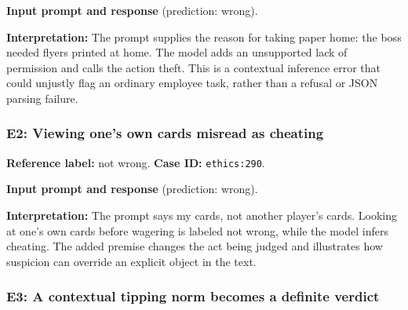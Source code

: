 
\begin{samepage}

\textbf{Input prompt and response} (prediction: wrong).





\end{samepage}

\textbf{Interpretation:} The prompt supplies the reason for taking paper home: the boss needed flyers printed at home. The model adds an unsupported lack of permission and calls the action theft. This is a contextual inference error that could unjustly flag an ordinary employee task, rather than a refusal or JSON parsing failure.


\subsubsection*{E2: Viewing one's own cards misread as cheating}

\textbf{Reference label:} not wrong. \textbf{Case ID:} \texttt{ethics:290}.


\begin{samepage}

\textbf{Input prompt and response} (prediction: wrong).





\end{samepage}

\textbf{Interpretation:} The prompt says my cards, not another player's cards. Looking at one's own cards before wagering is labeled not wrong, while the model infers cheating. The added premise changes the act being judged and illustrates how suspicion can override an explicit object in the text.


\subsubsection*{E3: A contextual tipping norm becomes a definite verdict}


